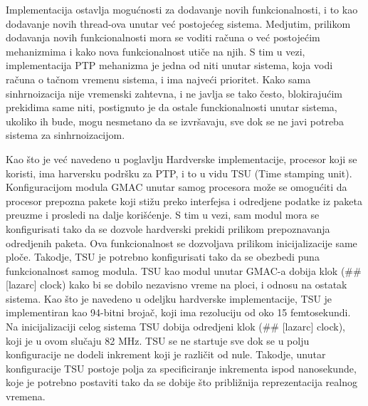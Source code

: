 \documentclass[a4paper,12pt, master]{etf}
\begin{document}
	Implementacija ostavlja mogu\'{c}nosti za dodavanje novih funkcionalnosti, 
	i to kao dodavanje novih thread-ova unutar ve\'{c} postoje\'{c}eg sistema. 
	Medjutim, prilikom dodavanja novih funkcionalnosti mora se voditi 
	ra\v{c}una o ve\'{c} postoje\'{c}im mehanizmima i kako nova funkcionalnost 
	uti\v{c}e na njih. S tim u vezi, implementacija PTP mehanizma je jedna od 
	niti unutar sistema, koja vodi ra\v{c}una o ta\v{c}nom vremenu sistema, i
	ima najve\'{c}i prioritet. Kako sama sinhrnoizacija nije vremenski zahtevna,
	 i ne javlja se tako \v{c}esto, blokiraju\'{c}im prekidima same niti, 
	postignuto je da ostale funckionalnosti unutar sistema, ukoliko ih bude, 
	mogu nesmetano da se izvr\v{s}avaju, sve dok se ne javi potreba sistema za 
	sinhrnoizacijom.

	Kao \v{s}to je ve\'{c} navedeno u poglavlju Hardverske implementacije, 
	procesor koji se koristi, ima harversku podr\v{s}ku za PTP, i to u vidu TSU 
	(Time stamping unit). Konfiguracijom modula GMAC unutar samog procesora 
	mo\v{z}e se omogu\'{c}iti da procesor prepozna pakete koji sti\v{z}u preko 
	interfejsa i odredjene podatke iz paketa preuzme i prosledi na dalje 
	kori\v{s}\'{c}enje. S tim u vezi, sam modul mora se konfigurisati tako da 
	se dozvole hardverski prekidi prilikom prepoznavanja odredjenih paketa. Ova 
	funkcionalnost se dozvoljava prilikom inicijalizacije same plo\v{c}e. 
	Takodje, TSU je potrebno konfigurisati tako da se obezbedi puna 
	funkcionalnost samog modula. TSU kao modul unutar GMAC-a dobija klok 
	(\#\# [lazarc] clock) kako bi se dobilo nezavisno vreme na ploci, i odnosu 
	na ostatak sistema. Kao \v{s}to je navedeno u odeljku hardverske 
	implementacije, TSU je implementiran kao 94-bitni broja\v{c}, koji ima 
	rezoluciju od oko 15 femtosekundi. Na inicijalizaciji celog sistema TSU 
	dobija odredjeni klok (\#\# [lazarc] clock), koji je u ovom slu\v{c}aju 82 
	MHz. TSU se ne startuje sve dok se u polju konfiguracije ne dodeli 
	inkrement koji je razli\v{c}it od nule. Takodje, unutar konfiguracije TSU 
	postoje polja za specificiranje inkrementa ispod nanosekunde, koje je 
	potrebno postaviti tako da se dobije \v{s}to pribli\v{z}nija reprezentacija 
	realnog vremena.
\end{document}
